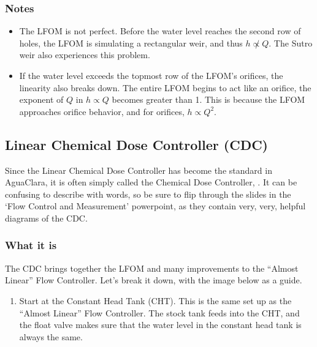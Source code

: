 \documentclass[letterpaper,10pt,english]{sphinxmanual}
\begin{document}
\subsubsection{Notes}
\label{\detokenize{Flow_Control_and_Measurement/FCM_Design:id8}}\begin{itemize}
\item {} 
The LFOM is not perfect. Before the water level reaches the second row of holes, the LFOM is simulating a rectangular weir, and thus \(h \not\propto Q\). The Sutro weir also experiences this problem.

\item {} 
If the water level exceeds the topmost row of the LFOM’s orifices, the linearity also breaks down. The entire LFOM begins to act like an orifice, the exponent of \(Q\) in \(h \propto Q\) becomes greater than 1. This is because the LFOM approaches orifice behavior, and for orifices, \(h \propto Q^2\).

\end{itemize}


\subsection{Linear Chemical Dose Controller (CDC)}
\label{\detokenize{Flow_Control_and_Measurement/FCM_Design:linear-chemical-dose-controller-cdc}}\label{\detokenize{Flow_Control_and_Measurement/FCM_Design:linear-cdc}}
Since the Linear Chemical Dose Controller has become the standard in AguaClara, it is often simply called the Chemical Dose Controller, . It can be confusing to describe with words, so be sure to flip through the slides in the ‘Flow Control and Measurement’ powerpoint, as they contain very, very, helpful diagrams of the CDC.


\subsubsection{What it is}
\label{\detokenize{Flow_Control_and_Measurement/FCM_Design:id9}}
The CDC brings together the LFOM and many improvements to the “Almost Linear” Flow Controller. Let’s break it down, with the image below as a guide.
\begin{enumerate}
\item {} 
Start at the Constant Head Tank (CHT). This is the same set up as the “Almost Linear” Flow Controller. The stock tank feeds into the CHT, and the float valve makes sure that the water level in the constant head tank is always the same.

\end{enumerate}
\end{document}
